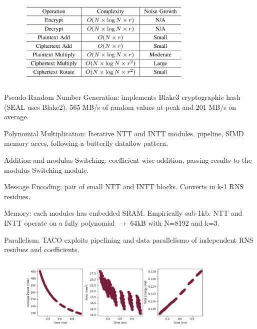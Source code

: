 \documentclass[10pt,handout]{beamer}
\begin{document}
\begin{frame}[noframenumbering]
\frametitle{}
\begin{figure}
    \includegraphics[width=0.75\textwidth]{complexity.png}
\end{figure}

\end{frame}

\begin{frame}[noframenumbering]
\frametitle{}
    Pseudo-Random Number Generation: implements Blake3 cryptographic hash (SEAL uses Blake2).
    565 MB/s of random values at peak and 201 MB/s on average.

    Polynomial Multiplication: Iterative NTT and INTT modules. pipeline, SIMD memory acces, following a
    butterfly dataflow pattern.

    Addition and modulus Switching: coefficient-wise addition, passing results to the modulus Switching module.

    Message Encoding: pair of small NTT and INTT blocks. Converts in k-1 RNS residues.

    Memory: each modules has embedded SRAM. Empirically sub-1kb. NTT and INTT operate on a fully
    polynomial $\rightarrow$ 64kB with N=8192 and k=3.

    Parallelism: TACO exploits pipelining and data parallelismo of independent RNS residues and coefficients.


\end{frame}

\begin{frame}[noframenumbering]
\frametitle{}
\begin{figure}
    \includegraphics[width=0.85\textwidth]{design-space.png}
\end{figure}
\end{frame}
\end{document}
